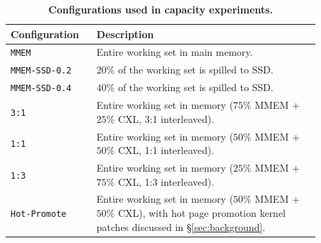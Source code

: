 \begin{table}[!t]
  \centering
  \small
  \begin{tabular}{|p{0.22\linewidth} | p{0.65\linewidth}|} 
        \hline
        Configuration & Description \\\hline
        \texttt{MMEM} & Entire working set in main memory. \\\hline
        \texttt{MMEM-SSD-0.2} & $20\%$ of the working set is spilled to SSD. \\\hline
        \texttt{MMEM-SSD-0.4} & $40\%$ of the working set is spilled to SSD. \\\hline
        \texttt{3:1} & Entire working set in memory ($75\%$ MMEM + $25\%$ CXL, 3:1 interleaved). \\\hline
        \texttt{1:1} & Entire working set in memory ($50\%$ MMEM + $50\%$ CXL, 1:1 interleaved). \\\hline
        \texttt{1:3} & Entire working set in memory ($25\%$ MMEM + $75\%$ CXL, 1:3 interleaved). \\\hline
        \texttt{Hot-Promote} & Entire working set in memory ($50\%$ MMEM + $50\%$ CXL), with hot page promotion kernel patches discussed in \S\ref{sec:background}. \\\hline
  \end{tabular}
  \caption[Configurations used in capacity experiments]{\textbf{Configurations used in capacity experiments.} }
  \label{tab:swconfig}
  \vspace{-1.5em}
\end{table}


